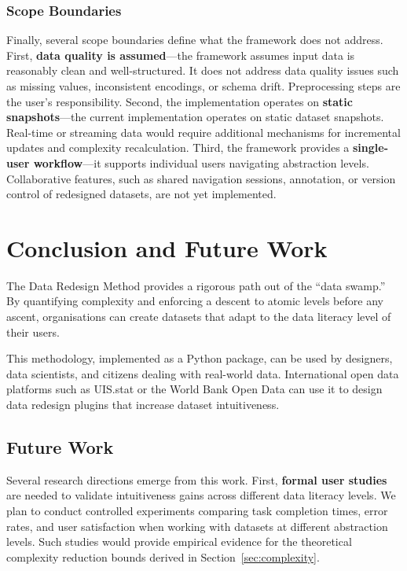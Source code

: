 \documentclass[12pt,a4paper]{article}
\begin{document}
\subsubsection{Scope Boundaries}

Finally, several scope boundaries define what the framework does not address. First, \textbf{data quality is assumed}---the framework assumes input data is reasonably clean and well-structured. It does not address data quality issues such as missing values, inconsistent encodings, or schema drift. Preprocessing steps are the user's responsibility. Second, the implementation operates on \textbf{static snapshots}---the current implementation operates on static dataset snapshots. Real-time or streaming data would require additional mechanisms for incremental updates and complexity recalculation. Third, the framework provides a \textbf{single-user workflow}---it supports individual users navigating abstraction levels. Collaborative features, such as shared navigation sessions, annotation, or version control of redesigned datasets, are not yet implemented.

\section{Conclusion and Future Work}
\label{sec:conclusion}

\noindent The Data Redesign Method provides a rigorous path out of the ``data swamp.'' By quantifying complexity and enforcing a descent to atomic levels before any ascent, organisations can create datasets that adapt to the data literacy level of their users.

\vspace{1em}

\noindent This methodology, implemented as a Python package, can be used by designers, data scientists, and citizens dealing with real-world data. International open data platforms such as UIS.stat or the World Bank Open Data can use it to design data redesign plugins that increase dataset intuitiveness.

\subsection{Future Work}

Several research directions emerge from this work. First, \textbf{formal user studies} are needed to validate intuitiveness gains across different data literacy levels. We plan to conduct controlled experiments comparing task completion times, error rates, and user satisfaction when working with datasets at different abstraction levels. Such studies would provide empirical evidence for the theoretical complexity reduction bounds derived in Section~\ref{sec:complexity}.
\end{document}
